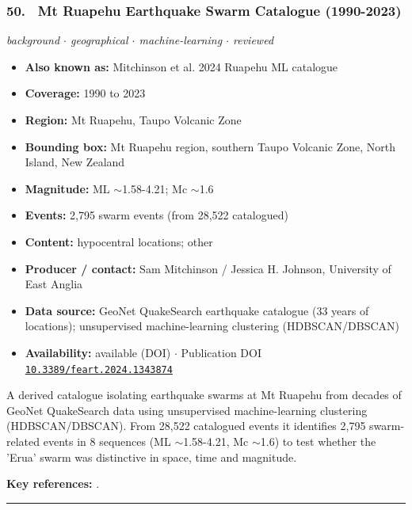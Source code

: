 \documentclass[10pt,a4paper]{article}
\newcommand{\catentryrule}{\par\vspace{3pt}\noindent\textcolor{rulegrey}{\rule{\linewidth}{0.3pt}}\par\vspace{5pt}}
\newcommand{\kv}[2]{\item \textbf{#1:} #2}
\begin{document}
\subsubsection*{\hypertarget{c:50}{50.}~ Mt Ruapehu Earthquake Swarm Catalogue (1990-2023)}
{\small\itshape background $\cdot$ geographical $\cdot$ machine-learning $\cdot$ reviewed}\par\vspace{2pt}
\begin{itemize}[leftmargin=1.3em,itemsep=0.6pt,topsep=1pt,parsep=0pt]
\kv{Also known as}{Mitchinson et al. 2024 Ruapehu ML catalogue}
\kv{Coverage}{1990 to 2023}
\kv{Region}{Mt Ruapehu, Taupo Volcanic Zone}
\kv{Bounding box}{Mt Ruapehu region, southern Taupo Volcanic Zone, North Island, New Zealand}
\kv{Magnitude}{ML $\sim$1.58-4.21; Mc $\sim$1.6}
\kv{Events}{2,795 swarm events (from 28,522 catalogued)}
\kv{Content}{hypocentral locations; other}
\kv{Producer / contact}{Sam Mitchinson / Jessica H. Johnson, University of East Anglia}
\kv{Data source}{GeoNet QuakeSearch earthquake catalogue (33 years of locations); unsupervised machine-learning clustering (HDBSCAN/DBSCAN)}
\kv{Availability}{available (DOI) $\cdot$ Publication DOI \href{https://doi.org/10.3389/feart.2024.1343874}{\nolinkurl{10.3389/feart.2024.1343874}}}
\end{itemize}
\par\vspace{2pt}A derived catalogue isolating earthquake swarms at Mt Ruapehu from decades of GeoNet QuakeSearch data using unsupervised machine-learning clustering (HDBSCAN/DBSCAN). From 28,522 catalogued events it identifies 2,795 swarm-related events in 8 sequences (ML $\sim$1.58-4.21, Mc $\sim$1.6) to test whether the 'Erua' swarm was distinctive in space, time and magnitude.
\par\vspace{2pt}\textbf{Key references:} \cite{Mitchinson2024}.
\catentryrule
\end{document}
